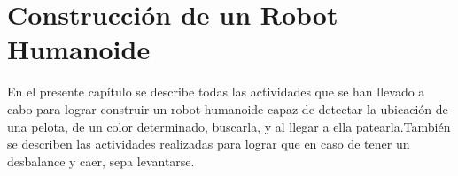 \chapter{Construcci\'on de un Robot Humanoide}\label{chapter:introAdesarrollo}

En el presente capítulo se describe todas las actividades que se han llevado a cabo para lograr construir un robot humanoide capaz de detectar la ubicación de una pelota, de un color determinado, buscarla, y al llegar a ella patearla.También se describen las actividades realizadas para lograr que en caso de tener un desbalance y caer, sepa levantarse.  



